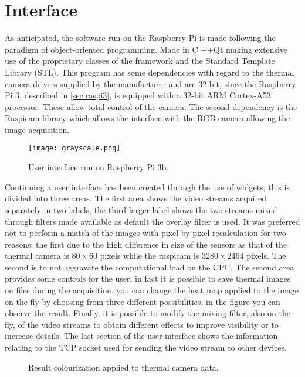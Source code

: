 %
\section{Interface}
\label{sec:raspberry-software}
As anticipated, the software run on the Raspberry Pi is made following the
paradigm of object-oriented programming. Made in C ++\/Qt making extensive use
of the proprietary classes of the framework and the Standard Template Library
(STL). This program has some dependencies with regard to the thermal camera
drivers supplied by the manufacturer and are 32-bit, since the Raspberry Pi 3,
described in \ref{sec:raspi3}, is equipped with a 32-bit ARM Cortex-A53
processor. These allow total control of the camera. The second dependency is the
Raspicam library which allows the interface with the RGB camera allowing the
image acquisition.
%
\begin{figure}[htb]
	\centering
	\texttt{[image: grayscale.png]}
	\caption{User interface run on Raspberry Pi 3b.}
	\label{fig:software-main-ui}
\end{figure}
%
Continuing a user interface has been created through the use of widgets, this is
divided into three areas. The first area shows the video streams acquired
separately in two labels, the third larger label shows the two streams mixed
through filters made available as default the overlay filter is used. It was
preferred not to perform a match of the images with pixel-by-pixel recalculation
for two reasons: the first due to the high difference in size of the sensors as
that of the thermal camera is $80 \times 60$ pixels while the raspicam is $3280
\times 2464$ pixels. The second is to not aggravate the computational load on
the CPU. The second area provides some controls for the user, in fact it is
possible to save thermal images on files during the acquisition. you can change
the heat map applied to the image on the fly by choosing from three different
possibilities, in the figure you can observe the result. 
Finally, it is possible to modify the mixing filter, also on the fly, of the
video streams to obtain different effects to improve visibility or to increase
details. The last section of the user interface shows the information relating
to the TCP socket used for sending the video stream to other devices.
%
\begin{figure}[htb]
    \centering
     \quad
     \quad
    \caption{Result colourization applied to thermal camera data.}
    \label{fig:reuslt-maps}
\end{figure}
%
